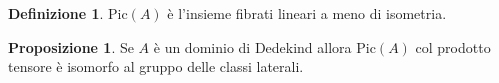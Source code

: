 \documentclass[a4paper,11pt,oneside]{book}
\newcommand{\Spec}{\mathrm{Spec}}
\newcommand{\inverti}[1]{{#1}^{-1}}
\newcommand{\set}[1]{\left\{ #1 \right\}}
\theoremstyle{definition}
\newtheorem{de}{Definizione}
\newtheorem{prop}{Proposizione}
\begin{document}
 \begin{de}
  Pic$(A)$ è l'insieme fibrati lineari a meno di isometria.
 \end{de}
 \begin{prop}
  Se $A$ è un dominio di Dedekind allora Pic$(A)$ col prodotto tensore è isomorfo al gruppo delle classi laterali.
 \end{prop}
\end{document}
